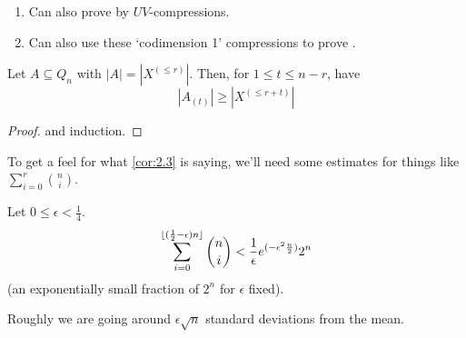 \documentclass{article}
\DeclarePairedDelimiter\floor{\lfloor}{\rfloor}
\let\subset\subseteq
\begin{document}
\begin{remark}\leavevmode
  \begin{enumerate}[label=\arabic*.]
    \item Can also prove  by $UV$-compressions.
    \item Can also use these `codimension 1' compressions to prove .
  \end{enumerate}
\end{remark}
\begin{ncor}\label{cor:2.3}
  Let $A \subset Q_n$ with $|A| = |X^{(\leq r)}|$. Then, for $1 \leq t \leq n-r$, have
  \begin{equation*}
    |A_{(t)}| \geq |X^{(\leq r + t)}|
  \end{equation*}
\end{ncor}
\begin{proof}
   and induction.
\end{proof}
To get a feel for what \cref{cor:2.3} is saying, we'll need some estimates for things like $\sum_{i=0}^r \binom{n}{i}$.
\begin{nprop}\label{prop:2.4}
  Let $0 \leq \epsilon < \frac{1}{4}$.
  \begin{equation*}
    \sum_{i=0}^{\floor{(\frac{1}{2} - \epsilon) n}} \binom{n}{i} < \frac{1}{\epsilon} e^{(-\epsilon^2 \frac{n}{2})} 2^n
  \end{equation*}
  (an exponentially small fraction of $2^n$ for $\epsilon$ fixed).
\end{nprop}
Roughly we are going around $\epsilon \sqrt{n}$ standard deviations from the mean.
\end{document}
